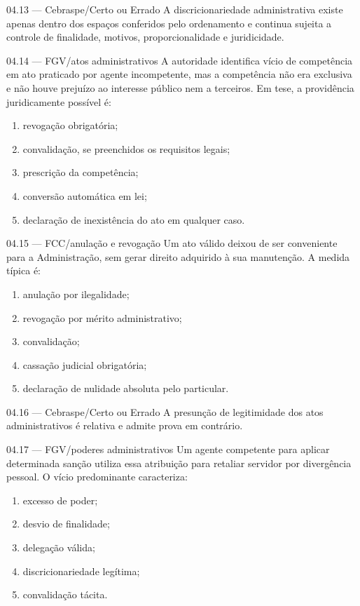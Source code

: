 \begin{questao}{ 04.13 — Cebraspe/Certo ou Errado}
A discricionariedade administrativa existe apenas dentro dos espaços conferidos pelo ordenamento e continua sujeita a controle de finalidade, motivos, proporcionalidade e juridicidade.
\end{questao}

\begin{questao}{ 04.14 — FGV/atos administrativos}
A autoridade identifica vício de competência em ato praticado por agente incompetente, mas a competência não era exclusiva e não houve prejuízo ao interesse público nem a terceiros. Em tese, a providência juridicamente possível é:
\begin{enumerate}[label=\Alph*)]
\item revogação obrigatória;
\item convalidação, se preenchidos os requisitos legais;
\item prescrição da competência;
\item conversão automática em lei;
\item declaração de inexistência do ato em qualquer caso.
\end{enumerate}
\end{questao}

\begin{questao}{ 04.15 — FCC/anulação e revogação}
Um ato válido deixou de ser conveniente para a Administração, sem gerar direito adquirido à sua manutenção. A medida típica é:
\begin{enumerate}[label=\Alph*)]
\item anulação por ilegalidade;
\item revogação por mérito administrativo;
\item convalidação;
\item cassação judicial obrigatória;
\item declaração de nulidade absoluta pelo particular.
\end{enumerate}
\end{questao}

\begin{questao}{ 04.16 — Cebraspe/Certo ou Errado}
A presunção de legitimidade dos atos administrativos é relativa e admite prova em contrário.
\end{questao}

\begin{questao}{ 04.17 — FGV/poderes administrativos}
Um agente competente para aplicar determinada sanção utiliza essa atribuição para retaliar servidor por divergência pessoal. O vício predominante caracteriza:
\begin{enumerate}[label=\Alph*)]
\item excesso de poder;
\item desvio de finalidade;
\item delegação válida;
\item discricionariedade legítima;
\item convalidação tácita.
\end{enumerate}
\end{questao}


